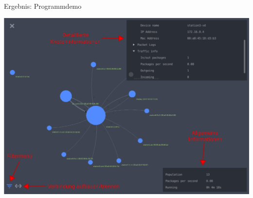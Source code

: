 \begin{frame}{Ergebnis: Programmdemo}
    \begin{center}
        \includegraphics[width=0.83\linewidth]{images/demo}
    \end{center}
\end{frame} 
